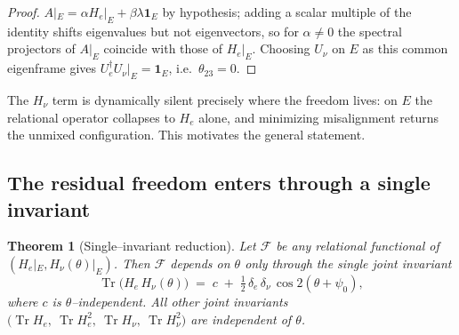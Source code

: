 \documentclass[11pt,a4paper]{article}
\newtheorem{theorem}{Theorem}
\theoremstyle{definition}
\newcommand{\He}{H_e}
\newcommand{\Hnu}{H_\nu}
\newcommand{\Tr}{\operatorname{Tr}}
\newcommand{\one}{\mathbf 1}
\begin{document}
\begin{proof}
$A|_E=\alpha\He|_E+\beta\lambda\one_E$ by hypothesis; adding a scalar multiple of
the identity shifts eigenvalues but not eigenvectors, so for $\alpha\ne0$ the
spectral projectors of $A|_E$ coincide with those of $\He|_E$. Choosing $U_\nu$ on
$E$ as this common eigenframe gives $U_e^\dagger U_\nu|_E=\one_E$, i.e.\
$\theta_{23}=0$.
\end{proof}

\noindent The $\Hnu$ term is dynamically silent precisely where the freedom
lives: on $E$ the relational operator collapses to $\He$ alone, and minimizing
misalignment returns the unmixed configuration. This motivates the general
statement.

\subsection{The residual freedom enters through a single invariant}

\begin{theorem}[Single--invariant reduction]\label{thm:single}
Let $\mathcal F$ be any relational functional of $(\He|_E,\Hnu(\theta)|_E)$. Then
$\mathcal F$ depends on $\theta$ only through the single joint invariant
\begin{equation}
  \Tr\!\bigl(\He\,\Hnu(\theta)\bigr)
  \;=\; c \;+\; \tfrac12\,\delta_e\,\delta_\nu\,\cos 2(\theta+\psi_0),
  \label{eq:overlap}
\end{equation}
where $c$ is $\theta$--independent. All other joint invariants
$\bigl(\Tr\He,\ \Tr\He^2,\ \Tr\Hnu,\ \Tr\Hnu^2\bigr)$ are independent of $\theta$.
\end{theorem}
\end{document}
